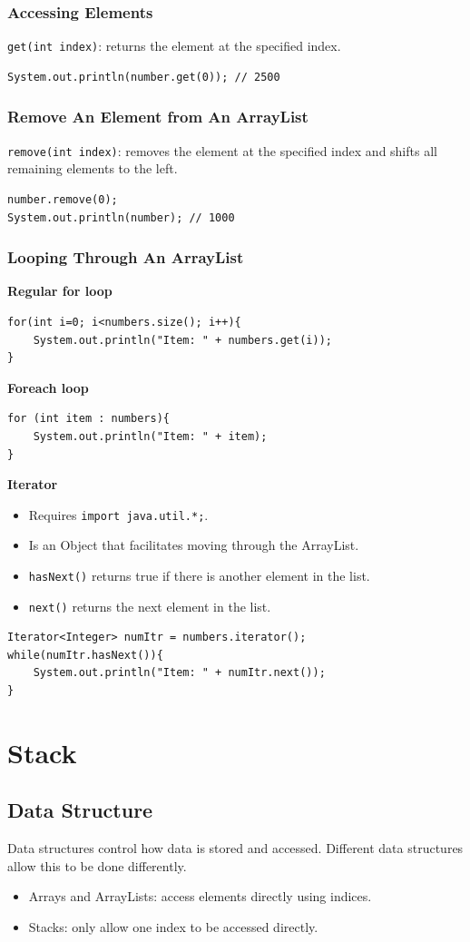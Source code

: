 \documentclass[letterpaper,12pt]{article}
\begin{document}
\subsubsection{Accessing Elements}
\texttt{get(int index)}: returns the element at the specified index.
\begin{verbatim}
System.out.println(number.get(0)); // 2500
\end{verbatim}
\subsubsection{Remove An Element from An ArrayList}
\texttt{remove(int index)}: removes the element at the specified index and shifts all remaining elements to the left.
\begin{verbatim}
number.remove(0);
System.out.println(number); // 1000
\end{verbatim}
\subsubsection{Looping Through An ArrayList}
\textbf{Regular for loop}
\begin{verbatim}
for(int i=0; i<numbers.size(); i++){
    System.out.println("Item: " + numbers.get(i));
}
\end{verbatim}
\textbf{Foreach loop}
\begin{verbatim}
for (int item : numbers){
    System.out.println("Item: " + item);
}
\end{verbatim}
\textbf{Iterator}
\begin{itemize}
    \item Requires \texttt{import java.util.*;}.
    \item Is an Object that facilitates moving through the ArrayList.
    \item \texttt{hasNext()} returns true if there is another element in the list.
    \item \texttt{next()} returns the next element in the list.
\end{itemize}
\begin{verbatim}
Iterator<Integer> numItr = numbers.iterator();
while(numItr.hasNext()){
    System.out.println("Item: " + numItr.next());
}
\end{verbatim}

\section{Stack}
\subsection{Data Structure}
Data structures control how data is stored and accessed. Different data structures allow this to be done differently.
\begin{itemize}
    \item Arrays and ArrayLists: access elements directly using indices.
    \item Stacks: only allow one index to be accessed directly.
\end{itemize}
\end{document}
